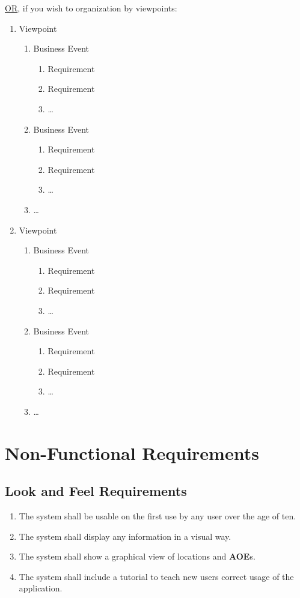 \documentclass[titlepage]{article}
\begin{document}
\underline{OR}, if you wish to organization by viewpoints:
\begin{enumerate}[{VP}1.]
	\item Viewpoint 
	\begin{enumerate}[{BE1}.1]
		\item Business Event
		\begin{enumerate}
			\item Requirement
			\item Requirement
			\item \dots
		\end{enumerate}
		\item Business Event
		\begin{enumerate}
			\item Requirement
			\item Requirement
			\item \dots
		\end{enumerate}
		\item \dots
	\end{enumerate}
	\item Viewpoint
	\begin{enumerate}[{BE2}.1]
		\item Business Event
		\begin{enumerate}
			\item Requirement
			\item Requirement
			\item \dots
		\end{enumerate}
		\item Business Event
		\begin{enumerate}
			\item Requirement
			\item Requirement
			\item \dots
		\end{enumerate}
		\item \dots
	\end{enumerate}
\end{enumerate}


\section{Non-Functional Requirements}
\label{sec:non-functional_requirements}


\subsection{Look and Feel Requirements}
\label{sub:look_and_feel_requirements}
\begin{enumerate}
\item
The system shall be usable on the first use by any user over the age of ten.
\item
The system shall display any information in a visual way. %
\item
The system shall show a graphical view of locations and \textbf{AOE}s.
\item
The system shall include a tutorial to teach new users correct usage of the application.
\end{enumerate}
\end{document}
